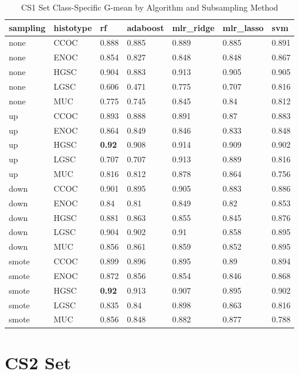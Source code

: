 \documentclass[
]{report}
\begin{document}
\begin{table}

\caption{\label{tab:cs1-gmean-class-table}CS1 Set Class-Specific G-mean by Algorithm and Subsampling Method}
\centering
\begin{tabular}[t]{l|l|l|l|l|l|l}
\hline
sampling & histotype & rf & adaboost & mlr\_ridge & mlr\_lasso & svm\\
\hline
none & CCOC & 0.888 & 0.885 & 0.889 & 0.885 & 0.891\\
\hline
none & ENOC & 0.854 & 0.827 & 0.848 & 0.848 & 0.867\\
\hline
none & HGSC & 0.904 & 0.883 & 0.913 & 0.905 & 0.905\\
\hline
none & LGSC & 0.606 & 0.471 & 0.775 & 0.707 & 0.816\\
\hline
none & MUC & 0.775 & 0.745 & 0.845 & 0.84 & 0.812\\
\hline
up & CCOC & 0.893 & 0.888 & 0.891 & 0.87 & 0.883\\
\hline
up & ENOC & 0.864 & 0.849 & 0.846 & 0.833 & 0.848\\
\hline
up & HGSC & \textbf{0.92} & 0.908 & 0.914 & 0.909 & 0.902\\
\hline
up & LGSC & 0.707 & 0.707 & 0.913 & 0.889 & 0.816\\
\hline
up & MUC & 0.816 & 0.812 & 0.878 & 0.864 & 0.756\\
\hline
down & CCOC & 0.901 & 0.895 & 0.905 & 0.883 & 0.886\\
\hline
down & ENOC & 0.84 & 0.81 & 0.849 & 0.82 & 0.853\\
\hline
down & HGSC & 0.881 & 0.863 & 0.855 & 0.845 & 0.876\\
\hline
down & LGSC & 0.904 & 0.902 & 0.91 & 0.858 & 0.895\\
\hline
down & MUC & 0.856 & 0.861 & 0.859 & 0.852 & 0.895\\
\hline
smote & CCOC & 0.899 & 0.896 & 0.895 & 0.89 & 0.894\\
\hline
smote & ENOC & 0.872 & 0.856 & 0.854 & 0.846 & 0.868\\
\hline
smote & HGSC & \textbf{0.92} & 0.913 & 0.907 & 0.895 & 0.902\\
\hline
smote & LGSC & 0.835 & 0.84 & 0.898 & 0.863 & 0.816\\
\hline
smote & MUC & 0.856 & 0.848 & 0.882 & 0.877 & 0.788\\
\hline
\end{tabular}
\end{table}

\hypertarget{cs2-set}{%
\section{CS2 Set}\label{cs2-set}}
\end{document}
